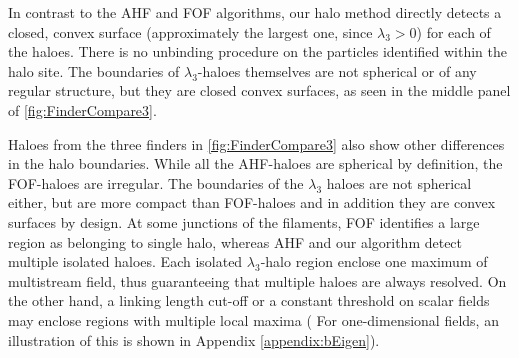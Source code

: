 In contrast to the AHF and FOF algorithms, our halo method directly detects a closed, convex surface (approximately the largest one, since $\lambda_3 >0$) for each of the haloes. There is no unbinding procedure on the particles identified within the halo site. The boundaries of $\lambda_3$-haloes themselves are not spherical or of any regular structure, but they are closed convex surfaces, as seen in the middle panel of \autoref{fig:FinderCompare3}. 



Haloes from the three finders in \autoref{fig:FinderCompare3} 
also show other differences in the halo boundaries. While all the AHF-haloes are spherical by definition, the FOF-haloes are irregular. The boundaries of the $\lambda_3$ haloes are not spherical either, but are more compact than FOF-haloes and in addition they are convex surfaces by design. At some junctions of the filaments, FOF identifies a large region as belonging to single halo, whereas AHF and our algorithm detect multiple isolated haloes. Each isolated $\lambda_3$-halo region enclose one maximum of multistream field, thus guaranteeing that multiple haloes are always resolved. On the other hand, a linking length cut-off or a constant threshold on scalar fields may enclose regions with multiple local maxima ( For one-dimensional fields, an illustration of this is shown in Appendix \ref{appendix:bEigen}). 
 
 
 

